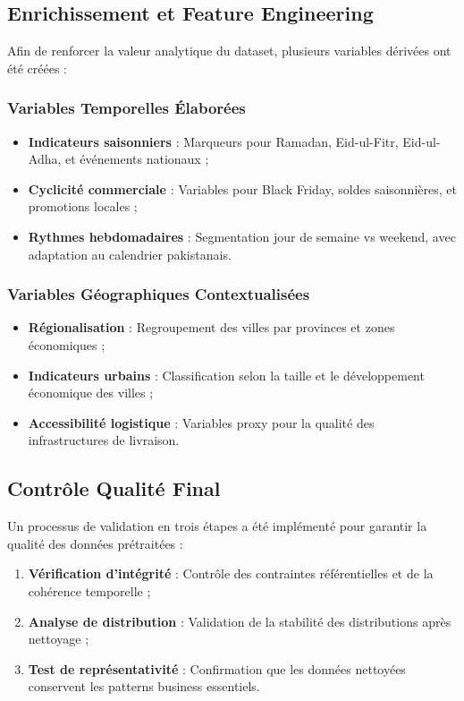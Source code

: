 \documentclass[a4paper,12pt]{article}
\begin{document}
\subsection{Enrichissement et Feature Engineering}

Afin de renforcer la valeur analytique du dataset, plusieurs variables dérivées ont été créées :

\subsubsection{Variables Temporelles Élaborées}
\begin{itemize}
    \item \textbf{Indicateurs saisonniers} : Marqueurs pour Ramadan, Eid-ul-Fitr, Eid-ul-Adha, et événements nationaux ;
    \item \textbf{Cyclicité commerciale} : Variables pour Black Friday, soldes saisonnières, et promotions locales ;
    \item \textbf{Rythmes hebdomadaires} : Segmentation jour de semaine vs weekend, avec adaptation au calendrier pakistanais.
\end{itemize}

\subsubsection{Variables Géographiques Contextualisées}
\begin{itemize}
    \item \textbf{Régionalisation} : Regroupement des villes par provinces et zones économiques ;
    \item \textbf{Indicateurs urbains} : Classification selon la taille et le développement économique des villes ;
    \item \textbf{Accessibilité logistique} : Variables proxy pour la qualité des infrastructures de livraison.
\end{itemize}

\subsection{Contrôle Qualité Final}

Un processus de validation en trois étapes a été implémenté pour garantir la qualité des données prétraitées :

\begin{enumerate}
    \item \textbf{Vérification d'intégrité} : Contrôle des contraintes référentielles et de la cohérence temporelle ;
    \item \textbf{Analyse de distribution} : Validation de la stabilité des distributions après nettoyage ;
    \item \textbf{Test de représentativité} : Confirmation que les données nettoyées conservent les patterns business essentiels.
\end{enumerate}
\end{document}
